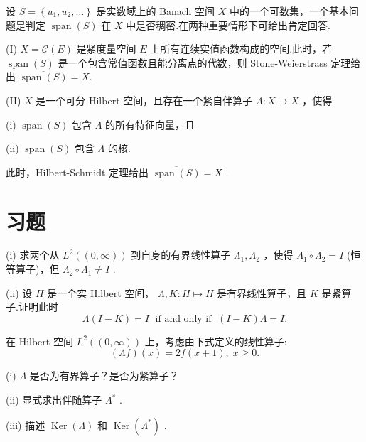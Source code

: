 \begin{remark}\label{rem:density-span-criteria}
设 $S = \left\{  {{u}_{1},{u}_{2},\ldots }\right\}$ 是实数域上的 Banach 空间 $X$ 中的一个可数集，一个基本问题是判定 $\operatorname{span}\left( S\right)$ 在 $X$ 中是否稠密.在两种重要情形下可给出肯定回答.

(I) $X = \mathcal{C}\left( E\right)$ 是紧度量空间 $E$ 上所有连续实值函数构成的空间.此时，若 $\operatorname{span}\left( S\right)$ 是一个包含常值函数且能分离点的代数，则 Stone-Weierstrass 定理给出 $\overline{\operatorname{span}\left( S\right) } = X$.

(II) $X$ 是一个可分 Hilbert 空间，且存在一个紧自伴算子 $\Lambda  : X \mapsto  X$ ，使得

(i) $\operatorname{span}\left( S\right)$ 包含 $\Lambda$ 的所有特征向量，且

(ii) $\operatorname{span}\left( S\right)$ 包含 $\Lambda$ 的核.

此时，Hilbert-Schmidt 定理给出 $\overline{\operatorname{span}\left( S\right) } = X$ .
\end{remark}

\section{习题}

\begin{rbhw}[index=1]
(i) 求两个从 ${L}^{2}\left( \left(  {0,\infty }\right)  \right)$ 到自身的有界线性算子 ${\Lambda }_{1},{\Lambda }_{2}$ ，使得 ${\Lambda }_{1} \circ  {\Lambda }_{2} = I$ (恒等算子)，但 ${\Lambda }_{2} \circ  {\Lambda }_{1} \neq  I$ .

(ii) 设 $H$ 是一个实 Hilbert 空间， $\Lambda ,K : H \mapsto  H$ 是有界线性算子，且 $K$ 是紧算子.证明此时
\[
\Lambda \left( {I - K}\right)  = I\;\text{ if and only if }\;\left( {I - K}\right) \Lambda  = I.
\]
\end{rbhw}

\begin{rbhw}
在 Hilbert 空间 ${L}^{2}\left( \left(  {0,\infty }\right)  \right)$ 上，考虑由下式定义的线性算子:
\[
\left( {\Lambda f}\right) \left( x\right)  = {2f}\left( {x + 1}\right) ,\;x \geq  0.
\]

(i) $\Lambda$ 是否为有界算子？是否为紧算子？

(ii) 显式求出伴随算子 ${\Lambda }^{ * }$ .

(iii) 描述 $\operatorname{Ker}\left( \Lambda \right)$ 和 $\operatorname{Ker}\left( {\Lambda }^{ * }\right)$ .
\end{rbhw}

